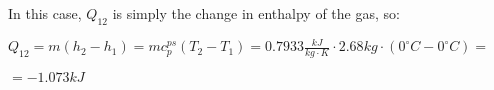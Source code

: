 In this case, \( Q_{12} \) is simply the change in enthalpy of the gas, so:

\( Q_{12} = m(h_2 - h_1) = m c_p^{ps} (T_2 - T_1) = 0.7933 \frac{kJ}{kg \cdot K} \cdot 2.68 kg \cdot (0^\circ C - 0^\circ C) = \)

\( = -1.073 kJ \)